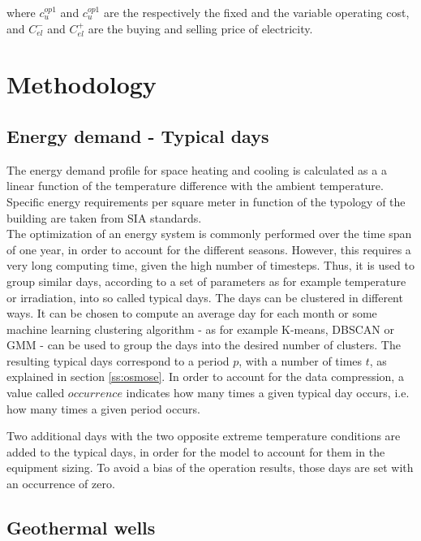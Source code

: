 \documentclass{article}
\begin{document}
where $c_{u}^{op1}$ and $c_{u}^{op1}$ are the respectively the fixed and the variable operating cost, and $C_{el}^{-}$ and $C_{el}^{+}$ are the buying and selling price of electricity.

\newpage
\section{Methodology}

\subsection{Energy demand - Typical days}\label{ss:typicalDays}
The energy demand profile for space heating and cooling is calculated as a a linear function of the temperature difference with the ambient temperature\cite{girardinEnerGisGeographicalInformation2010}. Specific energy requirements per square meter in function of the typology of the building are taken from SIA standards.\\

The optimization of an energy system is commonly performed over the time span of one year, in order to account for the different seasons. However, this requires a very long computing time, given the high number of timesteps. Thus, it is used to group similar days, according to a set of parameters as for example temperature or irradiation, into so called typical days. The days can be clustered in different ways. It can be chosen to compute an average day for each month or some machine learning clustering algorithm - as for example K-means, DBSCAN or GMM - can be used to group the days into the desired number of clusters.
The resulting typical days correspond to a period $p$, with a number of times $t$, as explained in section \ref{ss:osmose}. In order to account for the data compression, a value called $occurrence$ indicates how many times a given typical day occurs, i.e. how many times a given period occurs.

Two additional days with the two opposite extreme temperature conditions are added to the typical days, in order for the model to account for them in the equipment sizing. To avoid a bias of the operation results, those days are set with an occurrence of zero.


\subsection{Geothermal wells}\label{ss:gtw}
\end{document}
